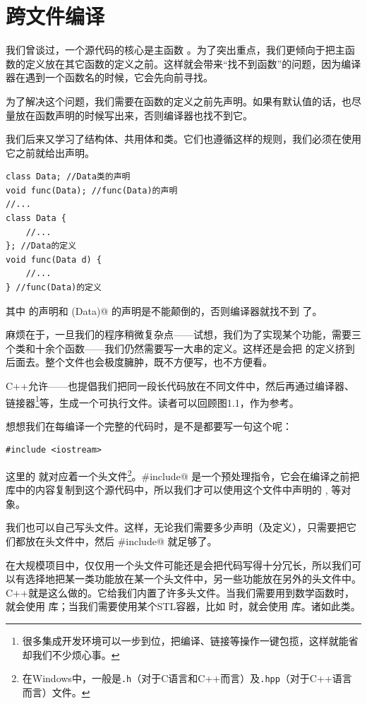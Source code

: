 \section{跨文件编译}
我们曾谈过，一个源代码的核心是主函数 \lstinline@main@。为了突出重点，我们更倾向于把主函数的定义放在其它函数的定义之前。这样就会带来``找不到函数''的问题，因为编译器在遇到一个函数名的时候，它会先向前寻找。\par
为了解决这个问题，我们需要在函数的定义之前先声明。如果有默认值的话，也尽量放在函数声明的时候写出来，否则编译器也找不到它。\par
我们后来又学习了结构体、共用体和类。它们也遵循这样的规则，我们必须在使用它之前就给出声明。
\begin{lstlisting}
class Data; //Data类的声明
void func(Data); //func(Data)的声明
//...
class Data {
    //...
}; //Data的定义
void func(Data d) {
    //...
} //func(Data)的定义
\end{lstlisting}
其中 \lstinline@Data@ 的声明和 \lstinline@func(Data)@ 的声明是不能颠倒的，否则编译器就找不到 \lstinline@Data@ 了。\par
麻烦在于，一旦我们的程序稍微复杂点——试想，我们为了实现某个功能，需要三个类和十余个函数——我们仍然需要写一大串的定义。这样还是会把 \lstinline@main@ 的定义挤到后面去。整个文件也会极度臃肿，既不方便写，也不方便看。\par
C++允许——也提倡我们把同一段长代码放在不同文件中，然后再通过编译器、链接器\footnote{很多集成开发环境可以一步到位，把编译、链接等操作一键包揽，这样就能省却我们不少烦心事。}等，生成一个可执行文件。读者可以回顾图1.1，作为参考。\par\pagebreak
想想我们在每编译一个完整的代码时，是不是都要写一句这个呢：
\begin{lstlisting}
#include <iostream>
\end{lstlisting}
这里的 \lstinline@iostream@ 就对应着一个头文件\footnote{在Windows中，一般是\texttt{.h}（对于C语言和C++而言）及\texttt{.hpp}（对于C++语言而言）文件。}。\lstinline@#include@ 是一个预处理指令，它会在编译之前把 \lstinline@iostream@ 库中的内容复制到这个源代码中，所以我们才可以使用这个文件中声明的 \lstinline@cin@, \lstinline@cout@ 等对象。\par
我们也可以自己写头文件。这样，无论我们需要多少声明（及定义），只需要把它们都放在头文件中，然后 \lstinline@#include@ 就足够了。\par
在大规模项目中，仅仅用一个头文件可能还是会把代码写得十分冗长，所以我们可以有选择地把某一类功能放在某一个头文件中，另一些功能放在另外的头文件中。C++就是这么做的。它给我们内置了许多头文件。当我们需要用到数学函数时，就会使用 \lstinline@cmath@ 库；当我们需要使用某个STL容器，比如 \lstinline@vector@ 时，就会使用 \lstinline@vector@ 库。诸如此类。\par
